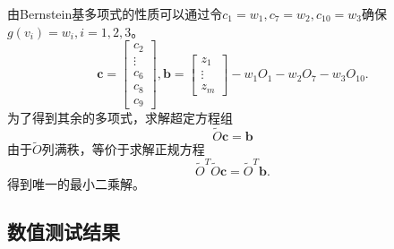 \begin{pro}
  由Bernstein基多项式的性质可以通过令$c_1 = w_1, c_7 = w_2, c_{10} = w_3$确保$g(v_i)=w_i,i=1,2,3$。
  \begin{displaymath}
    \boldsymbol{c} = \left[
      \begin{matrix}
        c_2\\
        \vdots\\
        c_6\\
        c_8\\
        c_9
      \end{matrix}
    \right], 
    \boldsymbol{b} = \left[
      \begin{matrix}
        z_1\\
        \vdots\\
        z_m
      \end{matrix}
    \right] - w_1O_1-w_2O_7-w_3O_{10}.      
  \end{displaymath}
  为了得到其余的多项式，求解超定方程组
  \begin{displaymath}
    \tilde{O}\boldsymbol{c} = \boldsymbol{b}
  \end{displaymath}
  由于$\tilde{O}$列满秩，等价于求解正规方程
  \begin{displaymath}
    \tilde{O}^T\tilde{O}\boldsymbol{c} = \tilde{O}^T\boldsymbol{b}.
  \end{displaymath}
  得到唯一的最小二乘解。
\end{pro}

\subsection{数值测试结果}

